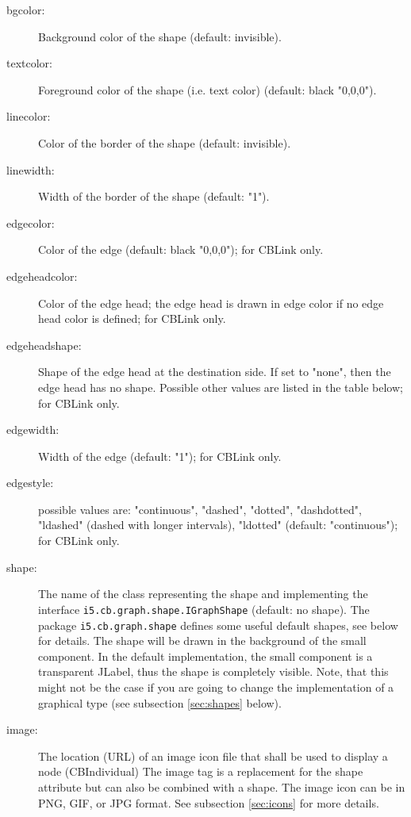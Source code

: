 \begin{description}
\item[bgcolor:]
    Background color of the shape (default: invisible).

\item[textcolor:]
    Foreground color of the shape (i.e. text color)  (default: black "0,0,0").

\item[linecolor:]
    Color of the border of the shape (default: invisible).

\item[linewidth:]
    Width of the border of the shape (default: "1").

\item[edgecolor:]
    Color of the edge (default: black "0,0,0"); for CBLink only.

\item[edgeheadcolor:]
    Color of the edge head; the edge head is drawn in edge color
    if no edge head color is defined; for CBLink only.

\item[edgeheadshape:]
    Shape of the edge head at the destination side. If set to "none",
    then the edge head has no shape. Possible other values are listed in the table below;
    for CBLink only.

\item[edgewidth:]
    Width of the edge (default: "1"); for CBLink only.

\item[edgestyle:]
    possible values are: "continuous", "dashed", "dotted", "dashdotted", "ldashed" (dashed with longer
    intervals), "ldotted"   (default: "continuous"); for CBLink only.

\item[shape:]
    The name of the class representing the shape and implementing the
    interface  {\tt i5.cb.graph.\-shape.IGraphShape} (default: no shape).
    The package {\tt i5.cb.graph.shape} defines some useful default shapes,
    see below for details. The shape will be drawn in the background
    of the small component. In the default implementation, the small
    component is a transparent JLabel, thus the shape is completely
    visible. Note, that this might not be the case if you are going
   to change the implementation of a graphical type (see subsection \ref{sec:shapes} below). 

\item[image:]
    The location (URL) of an image icon file that shall be used to display a node (CBIndividual)
    The image tag is a replacement for the shape attribute but can also be combined with a shape.
    The image icon can be in PNG, GIF, or JPG format.
    See subsection \ref{sec:icons} for more details.


\end{description}
